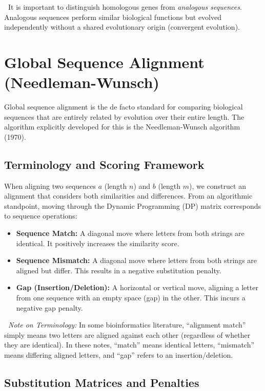 \documentclass[11pt, a4paper]{article}
\newcommand{\sta}{\textbf{\sffamily [CRITICAL / EXAM]\ }}
\begin{document}
\sta It is important to distinguish homologous genes from \textit{analogous sequences}. Analogous sequences perform similar biological functions but evolved independently without a shared evolutionary origin (convergent evolution).

\section{Global Sequence Alignment (Needleman-Wunsch)}

Global sequence alignment is the de facto standard for comparing biological sequences that are entirely related by evolution over their entire length. The algorithm explicitly developed for this is the Needleman-Wunsch algorithm (1970). 

\subsection{Terminology and Scoring Framework}

When aligning two sequences $a$ (length $n$) and $b$ (length $m$), we construct an alignment that considers both similarities and differences. 
From an algorithmic standpoint, moving through the Dynamic Programming (DP) matrix corresponds to sequence operations:
\begin{itemize}
    \item \textbf{Sequence Match:} A diagonal move where letters from both strings are identical. It positively increases the similarity score.
    \item \textbf{Sequence Mismatch:} A diagonal move where letters from both strings are aligned but differ. This results in a negative substitution penalty.
    \item \textbf{Gap (Insertion/Deletion):} A horizontal or vertical move, aligning a letter from one sequence with an empty space (gap) in the other. This incurs a negative gap penalty.
\end{itemize}

\sta \textit{Note on Terminology:} In some bioinformatics literature, ``alignment match'' simply means two letters are aligned against each other (regardless of whether they are identical). In these notes, ``match'' means identical letters, ``mismatch'' means differing aligned letters, and ``gap'' refers to an insertion/deletion.

\subsection{Substitution Matrices and Penalties}
\end{document}
